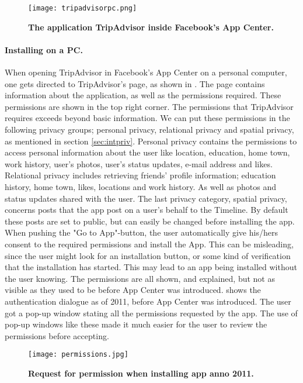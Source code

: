 \begin{figure}[t]
\centering
\texttt{[image: tripadvisorpc.png]}
\caption[The application TripAdvisor inside Facebook's App Center]{\textbf{The application TripAdvisor inside Facebook's App Center.} } 
\label{fig:tripadvisorpc}
\end{figure}


\paragraph{Installing on a PC.}
When opening TripAdvisor in Facebook's App Center on a personal computer, one gets directed to TripAdvisor's page, as shown in . The page contains information about the application, as well as the permissions required. These permissions are shown in the top right corner. The permissions that TripAdvisor requires exceeds beyond basic information. We can put these permissions in the following privacy groups; personal privacy, relational privacy and spatial privacy, as mentioned in section \ref{sec:intpriv}. Personal privacy contains the permissions to access personal information about the user like location, education, home town, work history, user's photos, user's status updates, e-mail address and likes. Relational privacy includes retrieving friends' profile information; education history, home town, likes, locations and work history. As well as photos and status updates shared with the user. The last privacy category, spatial privacy, concerns posts that the app post on a user's behalf to the Timeline. By default these posts are set to public, but can easily be changed before installing the app. When pushing the "Go to App"-button, the user automatically give his/hers consent to the required permissions and install the App. This can be misleading, since the user might look for an installation button, or some kind of verification that the installation has started. This may lead to an app being installed without the user knowing. The permissions are all shown, and explained, but not as visible as they used to be before App Center was introduced.  shows the authentication dialogue as of 2011, before App Center was introduced. The user got a pop-up window stating all the permissions requested by the app. The use of pop-up windows like these made it much easier for the user to review the permissions before accepting.


\begin{figure}[t]
\centering
\texttt{[image: permissions.jpg]}
\caption[Request for permission when installing app anno 2011]{\textbf{Request for permission when installing app anno 2011.} } 
\label{fig:permissions2011}
\end{figure}

